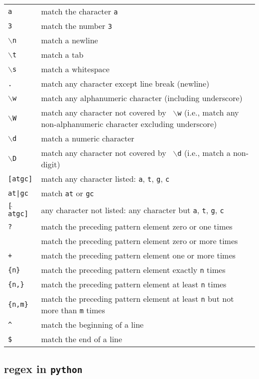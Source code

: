 \begin{tabular}{p{2cm} p{10cm}} 
 {\tt a} & match the character {\tt a}\\
 {\tt 3} & match the number {\tt 3}\\
 {\tt $\backslash$n} & match a newline\\
 {\tt $\backslash$t} & match a tab\\
 {\tt $\backslash$s} & match a whitespace\\
 {\tt .} & match any character except line break (newline)\\
 {\tt $\backslash$w} & match any alphanumeric character (including
underscore)\\
 {\tt $\backslash$W} & match any character not covered by {\tt 
 $\backslash$w} (i.e., match any non-alphanumeric character excluding 
 underscore)\\
 {\tt $\backslash$d} & match a numeric character\\
 {\tt $\backslash$D} & match any character not covered by {\tt 
 $\backslash$d} (i.e., match a non-digit)\\
 {\tt [atgc]} & match any character listed: {\tt a}, {\tt t}, {\tt g}, 
 {\tt c}\\
 {\tt at|gc} & match {\tt at} or {\tt gc}\\
 {\tt [$\hat{\,}$atgc]} & any character not listed: any character but 
 {\tt a}, {\tt t}, {\tt g}, {\tt c}\\
 {\tt ?} & match the preceding pattern element zero or one times\\
 {\tt *} & match the preceding pattern element zero or more times\\
 {\tt +} & match the preceding pattern element one or more times\\
 {\tt \{n\}} & match the preceding pattern element exactly {\tt n} times\\
 {\tt \{n,\}} & match the preceding pattern element at least {\tt n} times\\
 {\tt \{n,m\}} & match the preceding pattern element at least {\tt n}
but not more than {\tt m} times\\
 {\tt \textasciicircum} & match the beginning of a line\\
 {\tt \$} & match the end of a line\\
  \end{tabular}

\subsection {regex in {\tt python}}

